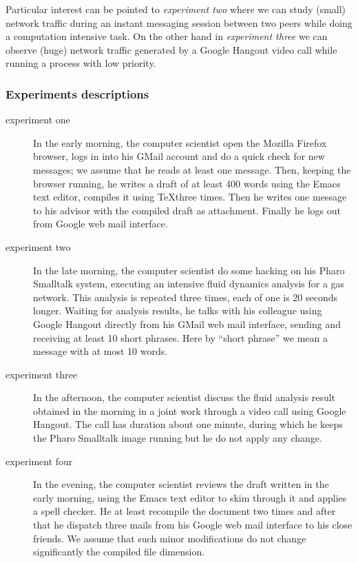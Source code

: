 \documentclass[10pt,a4paper]{article}
\begin{document}
    Particular interest can be pointed to \emph{experiment two} where
    we can study (small) network traffic during an instant messaging
    session between two peers while doing a computation intensive
    task. On the other hand in \emph{experiment three} we can observe
    (huge) network traffic generated by a Google Hangout video call
    while running a process with low priority.

    \subsubsection*{Experiments descriptions}
    
    \begin{description}
    \item[experiment one] In the early morning, the computer scientist
      open the Mozilla Firefox browser, logs in into his GMail account
      and do a quick check for new messages; we assume that he reads
      at least one message. Then, keeping the browser running, he
      writes a draft of at least 400 words using the Emacs text
      editor, compiles it using \TeX three times. Then he writes one
      message to his advisor with the compiled draft as
      attachment. Finally he logs out from Google web mail interface.
    \item[experiment two] In the late morning, the computer scientist
      do some hacking on his Pharo Smalltalk system, executing an
      intensive fluid dynamics analysis for a gas network. This
      analysis is repeated three times, each of one is 20 seconds
      longer. Waiting for analysis results, he talks with his
      colleague using Google Hangout directly from his GMail web mail
      interface, sending and receiving at least 10 short phrases. Here
      by ``short phrase'' we mean a message with at most 10 words.
    \item[experiment three] In the afternoon, the computer scientist
      discuss the fluid analysis result obtained in the morning in a
      joint work through a video call using Google Hangout. The call
      has duration about one minute, during which he keeps the Pharo
      Smalltalk image running but he do not apply any change.
    \item[experiment four] In the evening, the computer scientist
      reviews the draft written in the early morning, using the Emacs
      text editor to skim through it and applies a spell checker. He
      at least recompile the document two times and after that he
      dispatch three mails from his Google web mail interface to his
      close friends. We assume that such minor modifications do not
      change significantly the compiled file dimension.
    \end{description}
\end{document}

